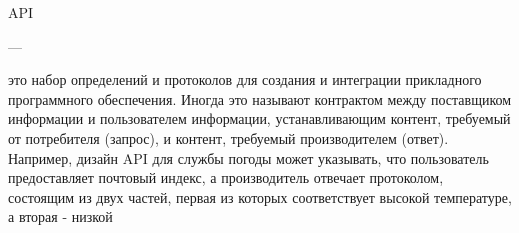 









\RaggedRight \noindent \justify \sloppy API
\begin{minipage}[t][][t]{3.15cm}
\RaggedLeft
  ---
\end{minipage}
\begin{minipage}[t][][t]{0.75\textwidth}
\RaggedRight  \justify \sloppy
 это набор определений и протоколов для создания и интеграции прикладного программного обеспечения. Иногда это называют контрактом между поставщиком информации и пользователем информации, устанавливающим контент, требуемый от потребителя (запрос), и контент, требуемый производителем (ответ). Например, дизайн API для службы погоды может указывать, что пользователь предоставляет почтовый индекс, а производитель отвечает протоколом, состоящим из двух частей, первая из которых соответствует высокой температуре, а вторая - низкой \\
\end{minipage}



